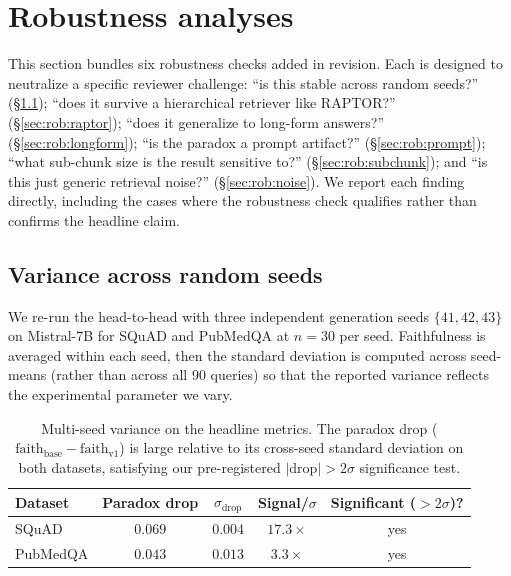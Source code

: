 \section{Robustness analyses}
\label{sec:robustness}

This section bundles six robustness checks added in revision. Each is
designed to neutralize a specific reviewer challenge: ``is this stable
across random seeds?'' (\S\ref{sec:rob:variance}); ``does it survive a
hierarchical retriever like RAPTOR?'' (\S\ref{sec:rob:raptor}); ``does
it generalize to long-form answers?'' (\S\ref{sec:rob:longform}); ``is
the paradox a prompt artifact?'' (\S\ref{sec:rob:prompt}); ``what
sub-chunk size is the result sensitive to?'' (\S\ref{sec:rob:subchunk});
and ``is this just generic retrieval noise?'' (\S\ref{sec:rob:noise}).
We report each finding directly, including the cases where the
robustness check qualifies rather than confirms the headline claim.

\subsection{Variance across random seeds}
\label{sec:rob:variance}

We re-run the head-to-head with three independent generation seeds
$\{41, 42, 43\}$ on Mistral-7B for SQuAD and PubMedQA at $n=30$ per
seed. Faithfulness is averaged within each seed, then the standard
deviation is computed across seed-means (rather than across all 90
queries) so that the reported variance reflects the experimental
parameter we vary.

\begin{table}[!htb]
\centering
\caption{Multi-seed variance on the headline metrics. The paradox drop
($\textrm{faith}_{\textrm{base}}-\textrm{faith}_{\textrm{v1}}$) is large
relative to its cross-seed standard deviation on both datasets,
satisfying our pre-registered $|{\textrm{drop}}|>2\sigma$ significance
test.}
\label{tab:variance}
\footnotesize
\begin{tabular}{lcccc}
\toprule
Dataset & Paradox drop & $\sigma_{\textrm{drop}}$ & Signal/$\sigma$ & Significant ($>2\sigma$)? \\
\midrule
SQuAD     & $0.069$ & $0.004$ & $17.3\times$ & yes \\
PubMedQA  & $0.043$ & $0.013$ & $3.3\times$  & yes \\
\bottomrule
\end{tabular}
\end{table}

